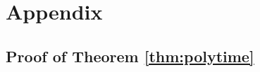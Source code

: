 \pagebreak
\section{Appendix}
\label{sec:appendix}
\newtheorem*{remark}{Remark}

\newcommand{\rp}{\right)}



\subsection{Proof of Theorem \ref{thm:polytime}}

